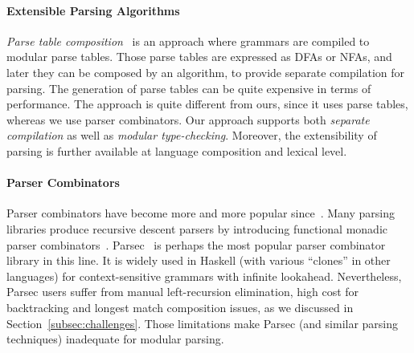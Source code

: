 
\paragraph{Extensible Parsing Algorithms}
\textit{Parse table composition}~\cite{bravenboer2008parse}
is an approach where grammars are compiled to
modular parse tables. Those parse tables are expressed as DFAs
or NFAs, and later they can be composed by an algorithm, to provide
separate compilation for parsing. The generation of parse tables can
be quite expensive in terms of performance. The approach
is quite different from ours, since it uses parse
 tables, whereas we use parser combinators.
Our approach supports both
\emph{separate compilation} as well as \emph{modular
  type-checking}. Moreover, the extensibility of parsing is further
available at language composition and lexical level.


\paragraph{Parser Combinators} Parser combinators have become more and more
popular since~\cite{burge1975,Wadler1985}. Many parsing libraries produce recursive descent
parsers by introducing functional monadic
parser combinators~\cite{nott237}. Parsec~\cite{Leijen2001} is
perhaps the most popular parser combinator library in this line.
It is widely used in Haskell (with various ``clones'' in other languages)
for context-sensitive grammars with infinite lookahead. Nevertheless,
Parsec users suffer from manual left-recursion elimination,
high cost for backtracking and longest match composition issues,
as we discussed in Section~\ref{subsec:challenges}. Those limitations make Parsec
(and similar parsing techniques) inadequate for modular parsing.

